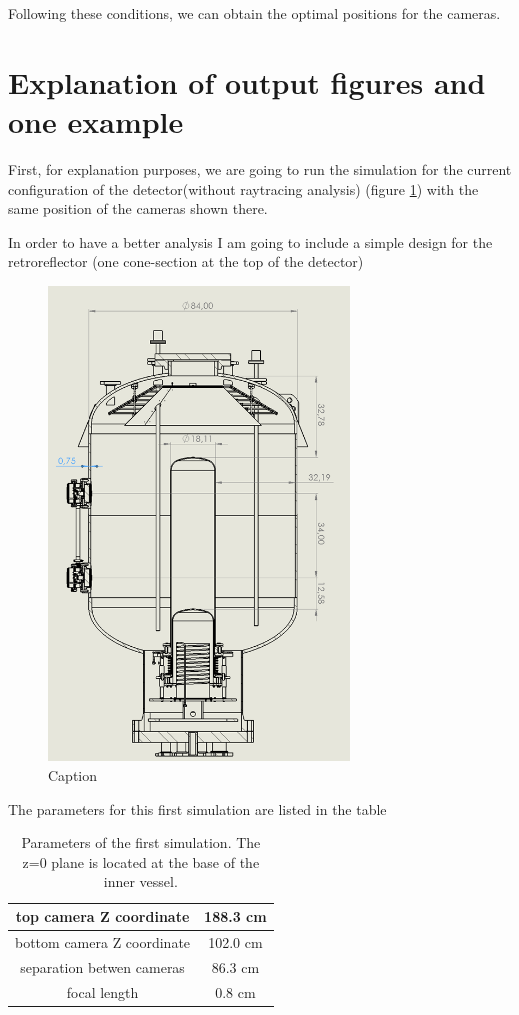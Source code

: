 \documentclass{article}
\begin{document}
Following these conditions, we can obtain the optimal positions for the cameras.




\section{Explanation of output figures and one example}


First, for explanation purposes, we are going to run the simulation for the current configuration of the detector(without raytracing analysis) (figure \ref{fig:drawing}) with the same position of the cameras shown there.

In order to have a better analysis I am going to include a simple design for the retroreflector (one cone-section at the top of the detector)


\begin{figure}
    \centering
    \includegraphics[width=8cm]{current_drawing.png}
    \caption{Caption}
    \label{fig:drawing}
\end{figure}

The parameters for this first simulation are listed in the table 

\begin{table}[]
    \centering
    \begin{tabular}{|c|c|}
        \hline
        top camera Z coordinate &  188.3 cm\\
        \hline
        bottom camera Z coordinate & 102.0 cm\\
        \hline
        separation betwen cameras & 86.3 cm\\
        \hline
        focal length & 0.8 cm\\
        \hline
        
    \end{tabular}
    \caption{Parameters of the first simulation. The z=0 plane is located at the base of the inner vessel.}
    \label{tab:my_label}
\end{table}
\end{document}

